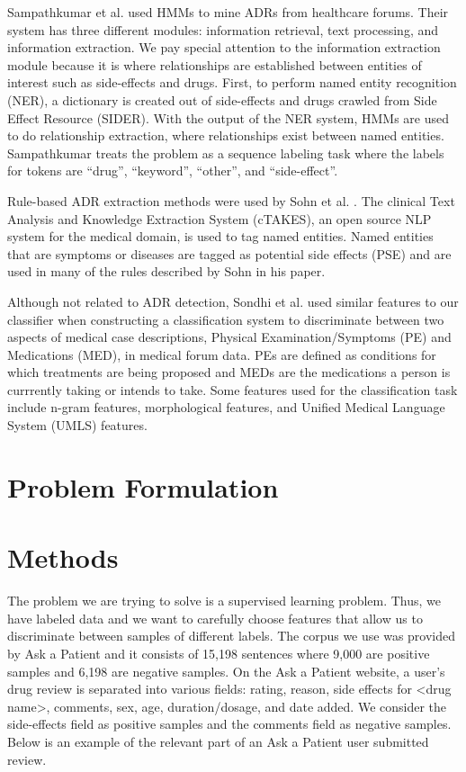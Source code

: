 \documentclass{acm_proc_article-sp}
\begin{document}
Sampathkumar et al. \cite{Sampathkumar} used HMMs to mine ADRs from healthcare forums. Their system has three different modules: information retrieval, text processing, and information extraction. We pay special attention to the information extraction module because it is where relationships are established between entities of interest such as side-effects and drugs. First, to perform named entity recognition (NER), a dictionary is created out of side-effects and drugs crawled from Side Effect Resource (SIDER). With the output of the NER system, HMMs are used to do relationship extraction, where relationships exist between named entities. Sampathkumar treats the problem as a sequence labeling task where the labels for tokens are ``drug'', ``keyword'', ``other'', and ``side-effect''.

Rule-based ADR extraction methods were used by Sohn et al. \cite{Sohn}. The clinical Text Analysis and Knowledge Extraction System (cTAKES), an open source NLP system for the medical domain, is used to tag named entities. Named entities that are symptoms or diseases are tagged as potential side effects (PSE) and are used in many of the rules described by Sohn in his paper.

Although not related to ADR detection, Sondhi et al. \cite{Sondhi}  used similar features to our classifier when constructing a classification system to discriminate between two aspects of medical case descriptions, Physical Examination/Symptoms (PE) and Medications (MED), in medical forum data. PEs are defined as conditions for which treatments are being proposed and MEDs are the medications a person is currrently taking or intends to take. Some features used for the classification task include n-gram features, morphological features, and Unified Medical Language System (UMLS) features.

\section{Problem Formulation}

\section{Methods}
The problem we are trying to solve is a supervised learning problem. Thus, we have labeled data and we want to carefully choose features that allow us to discriminate between samples of different labels. The corpus we use was provided by Ask a Patient and it consists of 15,198 sentences where 9,000 are positive samples and 6,198 are negative samples. On the Ask a Patient website, a user's drug review is separated into various fields: rating, reason, side effects for <drug name>, comments, sex, age, duration/dosage, and date added. We consider the side-effects field as positive samples and the comments field as negative samples. Below is an example of the relevant part of an Ask a Patient user submitted review.
\end{document}
